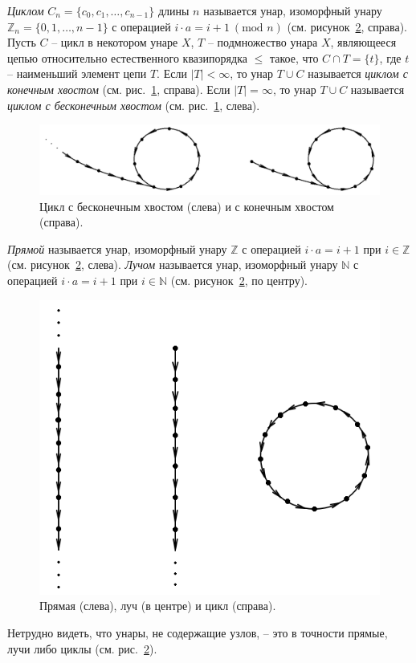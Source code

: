 \documentclass[11pt,twoside,final
]{article}
\begin{document}
\textit{Циклом} $C_n = \{ c_0, c_1, \ldots, c_{n - 1} \}$ длины $n$ называется унар, изоморфный унару $\mathbb{Z}_n = \{ 0, 1, \ldots, n - 1 \}$ с операцией $i \cdot a = i + 1 \ (\textrm{mod } n)$ (см. рисунок~\ref{fig:line_ray_cycle}, справа).
Пусть $C$ -- цикл в некотором унаре $X$, $T$ -- подмножество унара $X$, являющееся цепью относительно естественного квазипорядка $\leqslant$ такое, что $C \cap T = \{ t \}$, где $t$ -- наименьший элемент цепи $T$.
Если $|T| < \infty$, то унар $T \cup C$ называется \textit{циклом с конечным хвостом} (см. рис.~\ref{fig:tails}, справа).
Если $|T| = \infty$, то унар $T \cup C$ называется \textit{циклом с бесконечным хвостом} (см. рис.~\ref{fig:tails}, слева).
\begin{figure}[ht!]
	\centering
	\includegraphics[scale=0.4]{img/tails.png}
	\caption{Цикл с бесконечным хвостом (слева) и с конечным хвостом (справа).}
	\label{fig:tails}
\end{figure}
\textit{Прямой} называется унар, изоморфный унару $\mathbb{Z}$ с операцией $i \cdot a = i + 1$ при $i \in \mathbb{Z}$ (см. рисунок~\ref{fig:line_ray_cycle}, слева).
\textit{Лучом} называется унар, изоморфный унару $\mathbb{N}$ с операцией $i \cdot a = i + 1$ при $i \in \mathbb{N}$ (см. рисунок~\ref{fig:line_ray_cycle}, по центру).
\begin{figure}[ht!]
	\centering
	\includegraphics[scale=0.5]{img/line_ray_cycle.png}
	\caption{Прямая (слева), луч (в центре) и цикл (справа).}
	\label{fig:line_ray_cycle}
\end{figure}
Нетрудно видеть, что унары, не содержащие узлов, -- это в точности прямые, лучи либо циклы (см. рис.~\ref{fig:line_ray_cycle}).
\end{document}

